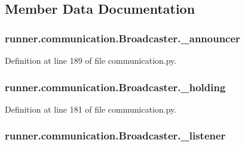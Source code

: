 \subsection{Member Data Documentation}
\hypertarget{classrunner_1_1communication_1_1Broadcaster_a74acd8833ef6e2e3752d3b0cb49ebb07}{}
\subsubsection[{\+\_\+announcer}]{\setlength{\rightskip}{0pt plus 5cm}runner.\+communication.\+Broadcaster.\+\_\+announcer\hspace{0.3cm}{\ttfamily [private]}}\label{classrunner_1_1communication_1_1Broadcaster_a74acd8833ef6e2e3752d3b0cb49ebb07}


Definition at line 189 of file communication.\+py.

\hypertarget{classrunner_1_1communication_1_1Broadcaster_ab3484375d0c55a6c0905ef4f36aa58aa}{}
\subsubsection[{\+\_\+holding}]{\setlength{\rightskip}{0pt plus 5cm}runner.\+communication.\+Broadcaster.\+\_\+holding\hspace{0.3cm}{\ttfamily [private]}}\label{classrunner_1_1communication_1_1Broadcaster_ab3484375d0c55a6c0905ef4f36aa58aa}


Definition at line 181 of file communication.\+py.

\hypertarget{classrunner_1_1communication_1_1Broadcaster_ae6dea599bb597fe1b4edc8f119b680a8}{}
\subsubsection[{\+\_\+listener}]{\setlength{\rightskip}{0pt plus 5cm}runner.\+communication.\+Broadcaster.\+\_\+listener\hspace{0.3cm}{\ttfamily [private]}}\label{classrunner_1_1communication_1_1Broadcaster_ae6dea599bb597fe1b4edc8f119b680a8}



